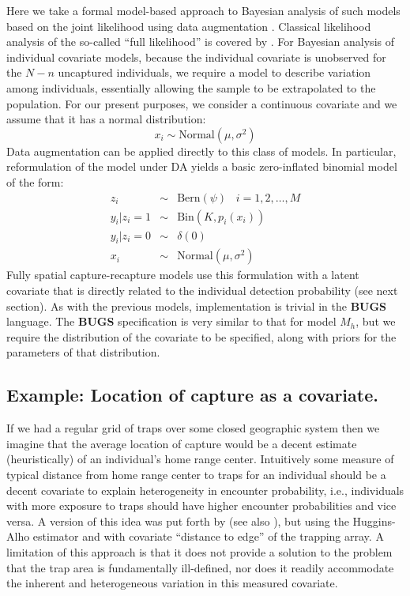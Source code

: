 Here we take a formal model-based approach to Bayesian analysis of
such models based on the joint likelihood
using data augmentation \citep{royle:2009}. Classical
likelihood analysis of the so-called ``full likelihood'' is covered 
 by \citet{borchers_etal:2002}.  For Bayesian analysis of
individual covariate models, because the individual covariate is
unobserved for the $N-n$ uncaptured individuals, we require a model to
describe variation among individuals, essentially allowing the sample
to be extrapolated to the population.  For our present purposes, we
consider a continuous covariate and we assume that it has a normal
distribution:
\[
x_{i} \sim \mbox{Normal}(\mu,\sigma^{2})
\]
Data augmentation can be applied directly to this class of models. In
particular, reformulation of the model under DA yields a basic
zero-inflated binomial model of the form:
\begin{eqnarray*}
z_{i} &\sim& \mbox{Bern}(\psi) \; \; \; i=1,2,\ldots,M\\
y_{i}|{z_{i}\! =\! 1} &\sim& \mbox{Bin}(K,p_{i}(x_{i})) \\
y_{i} |{ z_{i}\! =\! 0} &\sim& \delta(0)  \\
x_{i} & \sim & \mbox{Normal}(\mu,\sigma^{2})
\end{eqnarray*}
Fully spatial capture-recapture models use this
formulation with a latent covariate that is directly related to the
individual detection probability (see next section). As with the
previous models, implementation is trivial in the {\bf BUGS} language. The
{\bf BUGS} specification is very similar to that for model $M_h$, but we
require the distribution of the covariate to be specified, along with
priors for the parameters of that distribution.


\subsection{Example: Location of capture as a covariate.}

If we had a regular grid of traps over some closed geographic system
then we imagine that the average location of capture would be a decent
estimate (heuristically) of an individual's home range center.
Intuitively some measure of typical distance from home range center to
traps for an individual should be a decent covariate to explain
heterogeneity in encounter probability, i.e., individuals with more
exposure to traps should have higher encounter probabilities and vice
versa.  A version of this idea was put forth by
\citet{boulanger_mclellan:2001} (see also \citet{ivan:2012}), but
using the Huggins-Alho estimator and with covariate ``distance to
edge'' of the trapping array. A limitation of this  approach is
that it does not provide a solution to the problem that the trap area
is fundamentally ill-defined, nor does it readily accommodate the
inherent and heterogeneous variation in this measured covariate.

